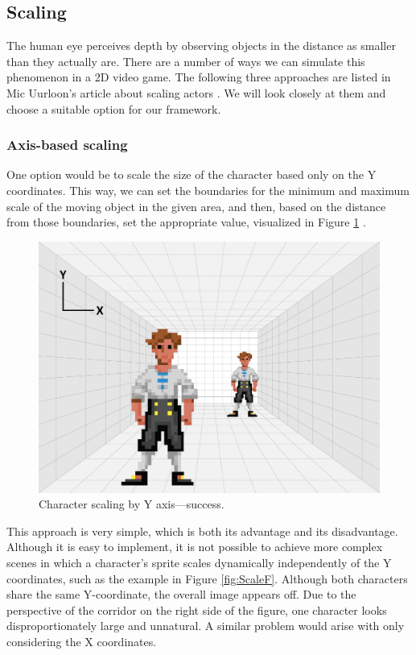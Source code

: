 \subsection{Scaling}
\label{analysis:depth:scaling}
The human eye perceives depth by observing objects in the distance as smaller than they actually are. There are a number of ways we can simulate this phenomenon in a 2D video game. The following three approaches are listed in Mic Uurloon's article about scaling actors \cite{Uurloon3}. We will look closely at them and choose a suitable option for our framework.

\subsubsection{Axis-based scaling}
One option would be to scale the size of the character based only on the Y coordinates. This way, we can set the boundaries for the minimum and maximum scale of the moving object in the given area, and then, based on the distance from those boundaries, set the appropriate value, visualized in Figure \ref{fig:Room} . 

\begin{figure}[H]
\centering
\includegraphics[width=.55\linewidth]{img/room2.png}
\caption{Character scaling by Y axis—success.}
\label{fig:Room}
\end{figure}

This approach is very simple, which is both its advantage and its disadvantage. Although it is easy to implement, it is not possible to achieve more complex scenes in which a character's sprite scales dynamically independently of the Y coordinates, such as the example in Figure \ref{fig:ScaleF}. Although both characters share the same Y-coordinate, the overall image appears off. Due to the perspective of the corridor on the right side of the figure, one character looks disproportionately large and unnatural.  A similar problem would arise with only considering the X coordinates.

